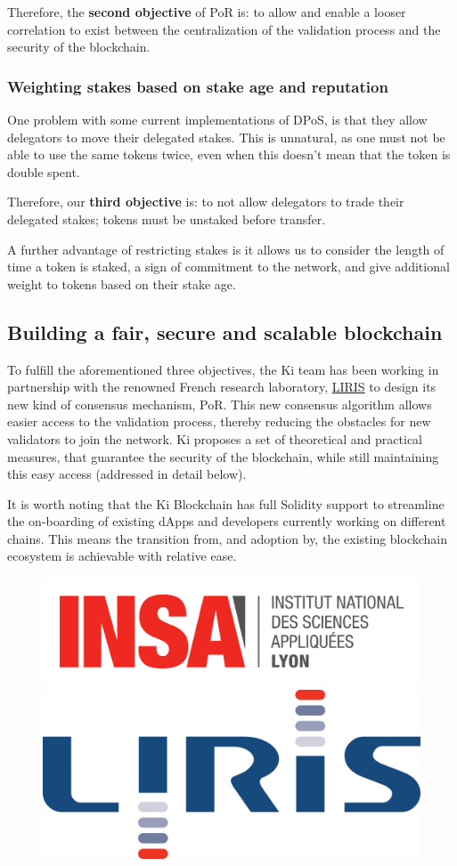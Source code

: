 Therefore, the \textbf{second objective} of PoR is: to allow and enable a looser correlation to exist between the centralization of the validation process and the security of the blockchain.

\subsubsection{Weighting stakes based on stake age and reputation}
\label{sec:kiblockchainstake}
One problem with some current implementations of DPoS, is that they allow delegators to move their delegated stakes. This is unnatural, as one must not be able to use the same tokens twice, even when this doesn't mean that the token is double spent.

Therefore, our \textbf{third objective} is: to not allow delegators to trade their delegated stakes; tokens must be unstaked before transfer.

A further advantage of restricting stakes is it allows us to consider the length of time a token is staked, a sign of commitment to the network, and give additional weight to tokens based on their stake age.

\subsection{Building a fair, secure and scalable blockchain}
\label{sec:kiblockchainproposal}
To fulfill the aforementioned three objectives, the Ki team has been working in partnership with the renowned French research laboratory, \href{https://liris.cnrs.fr}{LIRIS} to design its new kind of consensus mechanism, PoR. This new consensus algorithm allows easier access to the validation process, thereby reducing the obstacles for new validators to join the network. Ki proposes a set of theoretical and practical measures, that guarantee the security of the blockchain, while still maintaining this easy access (addressed in detail below).

It is worth noting that the Ki Blockchain has full Solidity support to streamline the on-boarding of existing dApps and developers currently working on different chains. This means the transition from, and adoption by, the existing blockchain ecosystem is achievable with relative ease.

\begin{figure}[ht]
    \centering
	\includegraphics[width=0.25\linewidth, trim= 0cm 0cm 0cm 0cm, clip, valign=c]{Figures/INSA.png}
	\includegraphics[width=0.25\linewidth, trim= 0cm 0cm 0cm 0cm, clip, valign=c]{Figures/liris.png}
	\label{fig:partners}
\end{figure}

